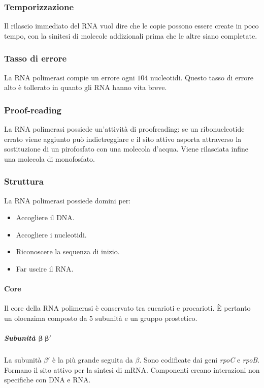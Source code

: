 		\subsubsection{Temporizzazione}
		Il rilascio immediato del RNA vuol dire che le copie possono essere create in poco tempo, con la sinitesi di molecole addizionali prima che le altre siano completate.

		\subsubsection{Tasso di errore}
		La RNA polimerasi compie un errore ogni $104$ nucleotidi.
		Questo tasso di errore alto \`e tollerato in quanto gli RNA hanno vita breve.

		\subsubsection{Proof-reading}
		La RNA polimerasi possiede un'attivit\`a di proofreading: se un ribonucleotide errato viene aggiunto pu\`o indietreggiare e il sito attivo asporta attraverso la sostituzione di un pirofosfato con una molecola d'acqua.
		Viene rilasciata infine una molecola di monofosfato.

		\subsubsection{Struttura}
		La RNA polimerasi possiede domini per:
		\begin{multicols}{2}
			\begin{itemize}
				\item Accogliere il DNA.
				\item Accogliere i nucleotidi.
				\item Riconoscere la sequenza di inizio.
				\item Far uscire il RNA.
			\end{itemize}
		\end{multicols}

			\paragraph{Core}
			Il core della RNA polimerasi \`e conservato tra eucarioti e procarioti.
			\`E pertanto un oloenzima composto da $5$ subunit\`a e un gruppo prostetico.

				\subparagraph{Subunit\`a $\mathbf{\beta\ \beta'}$}
				La subunit\`a $\beta'$ \`e la pi\`u grande seguita da $\beta$.
				Sono codificate dai geni \emph{rpoC} e \emph{rpoB}.
				Formano il sito attivo per la sintesi di mRNA.
				Componenti creano interazioni non specifiche con DNA e RNA.
	
